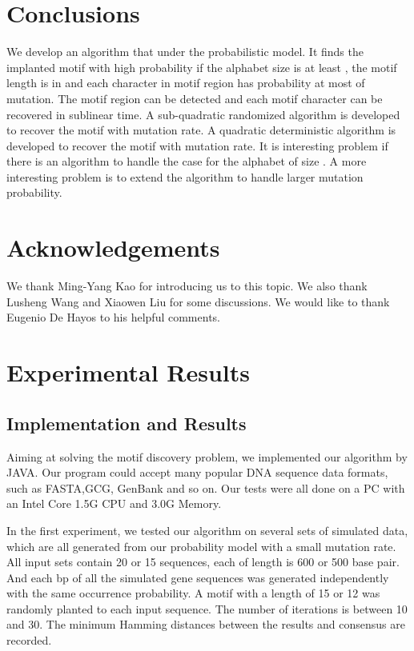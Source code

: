\documentclass[11pt]{article}
\begin{document}
\section{Conclusions}
We develop an algorithm that under the probabilistic model. It finds
the implanted motif with high probability if the alphabet size is at
least , the motif length is in  and each character in motif region has probability at
most  of mutation. The motif region can
be detected and each motif character can be recovered in sublinear
time. A sub-quadratic randomized algorithm is developed to recover
the motif with  mutation rate. A quadratic deterministic
algorithm is developed to recover the motif with 
mutation rate. It is interesting problem if there is an algorithm to
handle the case for the alphabet of size . A more interesting
problem is to extend the algorithm to handle larger mutation
probability.



 \section*{Acknowledgements} We thank Ming-Yang Kao for introducing
 us to this topic. We also thank
 Lusheng Wang and Xiaowen Liu for some discussions. We would like to
 thank Eugenio De Hayos to his helpful comments.






\section{Experimental Results}



\subsection{Implementation and Results}
\noindent Aiming at solving the motif discovery problem, we
implemented our algorithm by JAVA. Our program could accept many
popular DNA sequence data formats, such as FASTA,GCG, GenBank and so
on. Our tests were all done on a PC with an Intel Core 1.5G CPU and
3.0G Memory.

In the first experiment, we tested our  algorithm on several sets of
simulated data, which are all generated from our probability model
with a small mutation rate. All input sets contain 20 or 15
sequences, each of length is 600 or 500 base pair. And each bp of
all the simulated gene sequences was generated independently with
the same occurrence probability. A motif with a length of 15 or 12
was randomly planted to each input sequence. The number of
iterations is between 10 and 30. The minimum Hamming distances
between the results and consensus are recorded.
\end{document}
